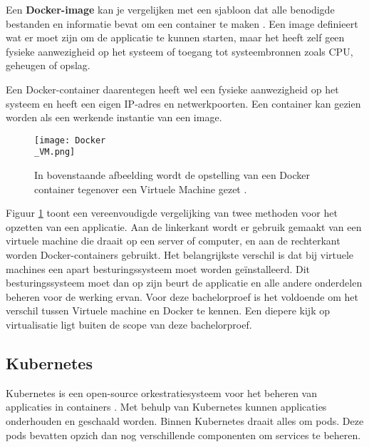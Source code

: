 Een \textbf{Docker-image} kan je vergelijken met een sjabloon dat alle benodigde bestanden en informatie bevat om een container te maken \autocite{Huang2018}. Een image definieert wat er moet zijn om de applicatie te kunnen starten, maar het heeft zelf geen fysieke aanwezigheid op het systeem of toegang tot systeembronnen zoals CPU, geheugen of opslag.

Een Docker-container daarentegen heeft wel een fysieke aanwezigheid op het systeem en heeft een eigen IP-adres en netwerkpoorten. Een container kan gezien worden als een werkende instantie van een image.

\begin{figure}[H]
	\centering
	\texttt{[image: Docker\\\_VM.png]}
	\caption[Voorstelling van Docker tegenover een Virtuele Machine]{\label{fig:Docker vs VM}In bovenstaande afbeelding wordt de opstelling van een Docker container tegenover een Virtuele Machine gezet \autocite{Kim2022}.}
\end{figure}

Figuur \ref{fig:Docker vs VM} toont een vereenvoudigde vergelijking van twee methoden voor het opzetten van een applicatie. Aan de linkerkant wordt er gebruik gemaakt van een virtuele machine die draait op een server of computer, en aan de rechterkant worden Docker-containers gebruikt. Het belangrijkste verschil is dat bij virtuele machines een apart besturingssysteem moet worden geïnstalleerd. Dit besturingssysteem moet dan op zijn beurt de applicatie en alle andere onderdelen beheren voor de werking ervan. Voor deze bachelorproef is het voldoende om het verschil tussen Virtuele machine en Docker te kennen. Een diepere kijk op virtualisatie ligt buiten de scope van deze bachelorproef.

\subsection{Kubernetes}

Kubernetes is een open-source orkestratiesysteem voor het beheren van applicaties in containers \autocite{Turin2023}. Met behulp van Kubernetes kunnen applicaties onderhouden en geschaald worden. Binnen Kubernetes draait alles om pods. Deze pods bevatten opzich dan nog verschillende componenten om services te beheren. 

